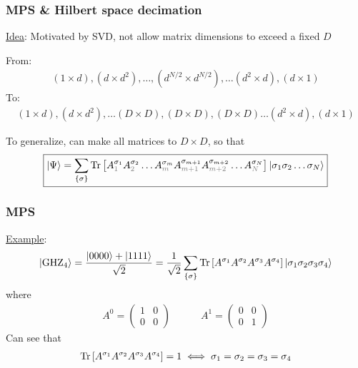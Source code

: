 \documentclass{beamer}
\theoremstyle{definition}
\newcommand{\lb}{\left[}
\newcommand{\rb}{\right]}
\newcommand{\f}[2]{\frac{#1}{#2}}
\begin{document}
\begin{frame}
	\frametitle{MPS \& Hilbert space decimation}
	\underline{Idea}: Motivated by SVD, not allow matrix dimensions to exceed a fixed $D$\\ \pause
	
	\vspace{10pt}
	
	From:
	\begin{align*}
		{(1\times d), (d\times d^2), \dots }, {(d^{N/2}\times d^{N/2})},  {\dots (d^2\times d), (d\times 1)}
	\end{align*}
	To:
	\begin{align*}
		{(1\times d), (d\times d^2), \dots (D\times D)}, {(D \times D)},  { (D\times D)\dots (d^2\times d), (d\times 1)}
	\end{align*}
	
	\vspace{10pt} \pause
	
	To generalize, can make all matrices to $D\times D$, so that
	\begin{align*}
		\boxed{\ket{\Psi} = \sum_{\{\sigma\}}   \Tr\lb  A_{\textcolor{gray}{1}}^{\sigma_1}A_{\textcolor{gray}{2}}^{\sigma_2}\dots A_{\textcolor{gray}{m}}^{\sigma_m}  A_{{\textcolor{gray}{m+1}}}^{\sigma_{m+1}}A_{{\textcolor{gray}{m+2}}}^{\sigma_{m+2}}\dots A_{\textcolor{gray}{N}}^{\sigma_N} \rb  \ket{\sigma_1\sigma_2\dots \sigma_N}}
	\end{align*}
	
	
	
\end{frame}


\begin{frame}
	\frametitle{MPS}
		\underline{Example}: 
	\begin{align*}
		\ket{\text{GHZ}_4} = \f{\ket{0000} + \ket{1111}}{\sqrt{2}}= \f{1}{\sqrt{2}}
		\sum_{\{\sigma\}} \Tr \lb  A^{\sigma_1} A^{\sigma_2} A^{\sigma_3} A^{\sigma_4} \rb \ket{\sigma_1\sigma_2\sigma_3\sigma_4}
	\end{align*} 
\pause
	where
	\begin{align*}
		A^0 = \begin{pmatrix}
			1 & 0 \\ 0 & 0 
		\end{pmatrix} \quad\quad \quad 
	A^1 = \begin{pmatrix}
		0 & 0 \\ 0 & 1
	\end{pmatrix}
	\end{align*}
	Can see that
	\begin{align*}
		\Tr \lb  A^{\sigma_1} A^{\sigma_2} A^{\sigma_3} A^{\sigma_4} \rb = 1 \iff \sigma_1 = \sigma_2 = \sigma_3 = \sigma_4
	\end{align*}
	
\end{frame}
\end{document}
